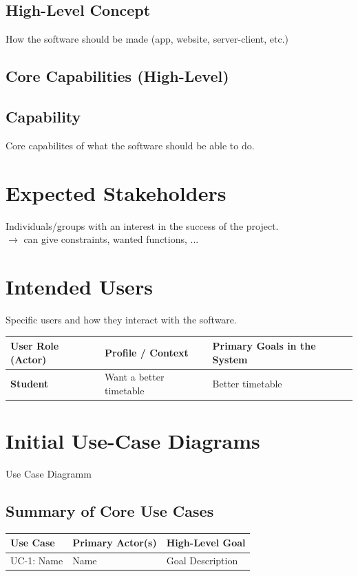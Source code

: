 \documentclass[11pt, a4paper]{article}
\begin{document}
\subsection*{High-Level Concept}
How the software should be made (app, website, server-client, etc.)

\subsection*{Core Capabilities (High-Level)}

\subsection{Capability}
Core capabilites of what the software should be able to do.

\section{Expected Stakeholders}
Individuals/groups with an interest in the success of the project. \\
$\rightarrow$ can give constraints, wanted functions, ...

\section{Intended Users}
Specific users and how they interact with the software. \\
  
\begin{tabularx}{\textwidth}{@{} l X X @{}}
    \toprule
    \textbf{User Role (Actor)} & \textbf{Profile / Context} & \textbf{Primary Goals in the System} \\
    \midrule
    \textbf{Student} & Want a better timetable & Better timetable \\
    \bottomrule
\end{tabularx}

\section{Initial Use-Case Diagrams}

Use Case Diagramm

\subsection*{Summary of Core Use Cases}
\begin{tabularx}{\textwidth}{@{} l l X @{}}
    \toprule
    \textbf{Use Case} & \textbf{Primary Actor(s)} & \textbf{High-Level Goal} \\
    \midrule
    UC-1: Name & Name & Goal Description \\

    \bottomrule
\end{tabularx}
\end{document}
